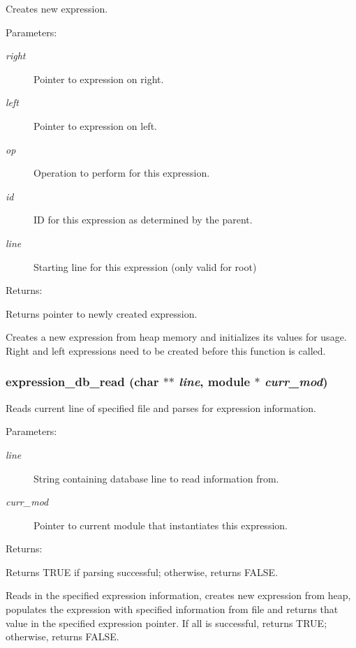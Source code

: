 Creates new expression.

\begin{Desc}
\item[Parameters: ]\par
\begin{description}
\item[{\em 
right}]Pointer to expression on right. \item[{\em 
left}]Pointer to expression on left. \item[{\em 
op}]Operation to perform for this expression. \item[{\em 
id}]ID for this expression as determined by the parent. \item[{\em 
line}]Starting line for this expression (only valid for root)\end{description}
\end{Desc}
\begin{Desc}
\item[Returns: ]\par
Returns pointer to newly created expression.\end{Desc}
Creates a new expression from heap memory and initializes its values for usage. Right and left expressions need to be created before this function is called. 
\subsubsection{ expression\_\-db\_\-read (char $\ast$$\ast$ {\em line}, {\bf module} $\ast$ {\em curr\_\-mod})}\label{expr_8h_a4}


Reads current line of specified file and parses for expression information.

\begin{Desc}
\item[Parameters: ]\par
\begin{description}
\item[{\em 
line}]String containing database line to read information from. \item[{\em 
curr\_\-mod}]Pointer to current module that instantiates this expression.\end{description}
\end{Desc}
\begin{Desc}
\item[Returns: ]\par
Returns TRUE if parsing successful; otherwise, returns FALSE.\end{Desc}
Reads in the specified expression information, creates new expression from heap, populates the expression with specified information from file and  returns that value in the specified expression pointer. If all is  successful, returns TRUE; otherwise, returns FALSE. 
